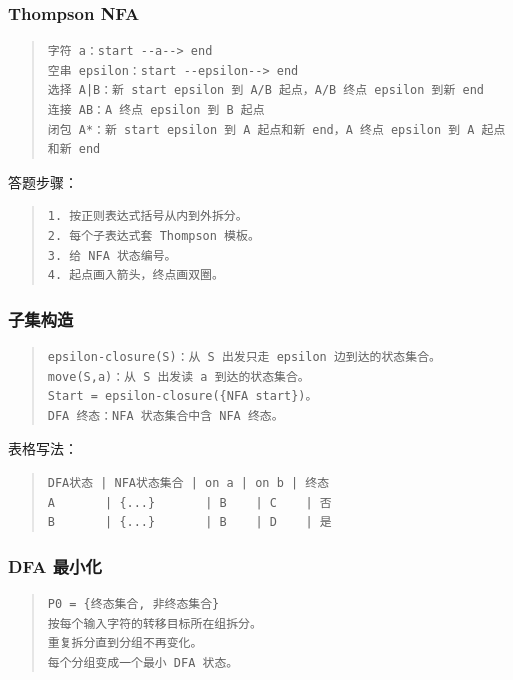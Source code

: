 \documentclass[UTF8,zihao=-4]{ctexart}
\begin{document}
\subsubsection{Thompson NFA}


\begin{quote}
\footnotesize
\begin{verbatim}
字符 a：start --a--> end
空串 epsilon：start --epsilon--> end
选择 A|B：新 start epsilon 到 A/B 起点，A/B 终点 epsilon 到新 end
连接 AB：A 终点 epsilon 到 B 起点
闭包 A*：新 start epsilon 到 A 起点和新 end，A 终点 epsilon 到 A 起点和新 end
\end{verbatim}
\end{quote}


答题步骤：


\begin{quote}
\footnotesize
\begin{verbatim}
1. 按正则表达式括号从内到外拆分。
2. 每个子表达式套 Thompson 模板。
3. 给 NFA 状态编号。
4. 起点画入箭头，终点画双圈。
\end{verbatim}
\end{quote}


\subsubsection{子集构造}


\begin{quote}
\footnotesize
\begin{verbatim}
epsilon-closure(S)：从 S 出发只走 epsilon 边到达的状态集合。
move(S,a)：从 S 出发读 a 到达的状态集合。
Start = epsilon-closure({NFA start})。
DFA 终态：NFA 状态集合中含 NFA 终态。
\end{verbatim}
\end{quote}


表格写法：


\begin{quote}
\footnotesize
\begin{verbatim}
DFA状态 | NFA状态集合 | on a | on b | 终态
A       | {...}       | B    | C    | 否
B       | {...}       | B    | D    | 是
\end{verbatim}
\end{quote}


\subsubsection{DFA 最小化}


\begin{quote}
\footnotesize
\begin{verbatim}
P0 = {终态集合, 非终态集合}
按每个输入字符的转移目标所在组拆分。
重复拆分直到分组不再变化。
每个分组变成一个最小 DFA 状态。
\end{verbatim}
\end{quote}
\end{document}
